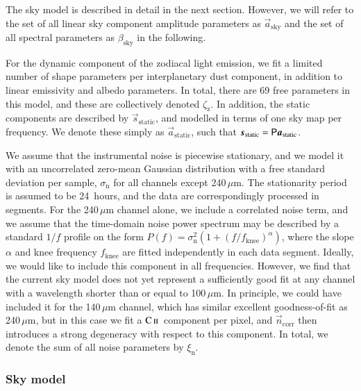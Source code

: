 \documentclass{aa}
\newcommand{\CII}{\ensuremath{\textsc{C\,ii}}}
\newcommand{\n}[0]{\vec{n}}
\newcommand{\s}[0]{\vec{s}}
\renewcommand{\a}[0]{\vec{a}}
\renewcommand{\P}[0]{\tens{P}}
\begin{document}
The sky model is described in detail in the next section. However, we
will refer to the set of all linear sky component amplitude parameters
as $\a_{\mathrm{sky}}$ and the set of all spectral parameters as
$\beta_{\mathrm{sky}}$ in the following.

For the dynamic component of the zodiacal light emission, we fit a
limited number of shape parameters per interplanetary dust component,
in addition to linear emissivity and albedo parameters. In total,
there are 69 free parameters in this model, and these are collectively
denoted $\zeta_{\mathrm{z}}$. In addition, the static components are
described by $\s_{\mathrm{static}}$, and modelled in terms of one sky
map per frequency. We denote these simply as $\a_{\mathrm{static}}$,
such that $\s_{\mathrm{static}} = \P\a_{\mathrm{static}}$.

We assume that the instrumental noise is piecewise stationary, and we
model it with an uncorrelated zero-mean Gaussian distribution with a
free standard deviation per sample, $\sigma_{\mathrm{n}}$ for all
channels except 240\,$\mu$m. The stationarity period is assumed to be
24~hours, and the data are correspondingly processed in segments. For
the 240\,$\mu$m channel alone, we include a correlated noise term, and
we assume that the time-domain noise power spectrum may be described
by a standard $1/f$ profile on the form $P(f) = \sigma_{\mathrm{n}}^2
(1+(f/f_{\mathrm{knee}})^{\alpha})$, where the slope $\alpha$ and knee
frequency $f_{\mathrm{knee}}$ are fitted independently in each data
segment. Ideally, we would like to include this component in all
frequencies. However, we find that the current sky model does not yet
represent a sufficiently good fit at any channel with a wavelength
shorter than or equal to 100\,$\mu$m. In principle, we could have
included it for the 140\,$\mu$m channel, which has similar excellent
goodness-of-fit as 240\,$\mu$m, but in this case we fit a
\CII\ component per pixel, and $\n_{\mathrm{corr}}$ then introduces a
strong degeneracy with respect to this component. In total, we denote
the sum of all noise parameters by $\xi_{\mathrm{n}}$.


\subsubsection{Sky model}
\end{document}
